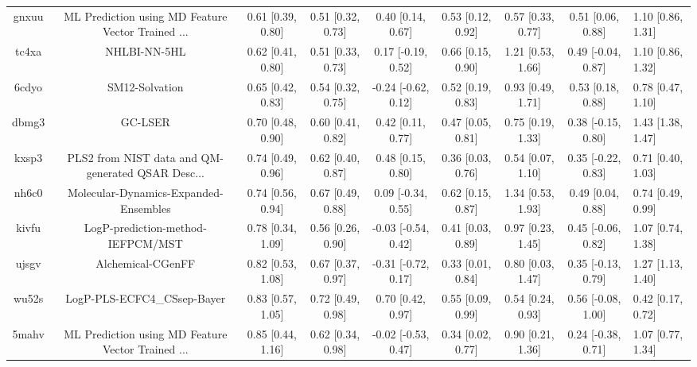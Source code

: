 \documentclass{article}
\begin{document}
\begin{center}
\begin{longtable}{|cccccccc|}
 gnxuu &  ML Prediction using MD Feature Vector Trained ... &  0.61 [0.39, 0.80] &  0.51 [0.32, 0.73] &     0.40 [0.14, 0.67] &  0.53 [0.12, 0.92] &    0.57 [0.33, 0.77] &    0.51 [0.06, 0.88] &     1.10 [0.86, 1.31] \\
 tc4xa &                                       NHLBI-NN-5HL &  0.62 [0.41, 0.80] &  0.51 [0.33, 0.73] &    0.17 [-0.19, 0.52] &  0.66 [0.15, 0.90] &    1.21 [0.53, 1.66] &   0.49 [-0.04, 0.87] &     1.10 [0.86, 1.32] \\
 6cdyo &                                     SM12-Solvation &  0.65 [0.42, 0.83] &  0.54 [0.32, 0.75] &   -0.24 [-0.62, 0.12] &  0.52 [0.19, 0.83] &    0.93 [0.49, 1.71] &    0.53 [0.18, 0.88] &     0.78 [0.47, 1.10] \\
 dbmg3 &                                            GC-LSER &  0.70 [0.48, 0.90] &  0.60 [0.41, 0.82] &     0.42 [0.11, 0.77] &  0.47 [0.05, 0.81] &    0.75 [0.19, 1.33] &   0.38 [-0.15, 0.80] &     1.43 [1.38, 1.47] \\
 kxsp3 &  PLS2 from NIST data and QM-generated QSAR Desc... &  0.74 [0.49, 0.96] &  0.62 [0.40, 0.87] &     0.48 [0.15, 0.80] &  0.36 [0.03, 0.76] &    0.54 [0.07, 1.10] &   0.35 [-0.22, 0.83] &     0.71 [0.40, 1.03] \\
 nh6c0 &              Molecular-Dynamics-Expanded-Ensembles &  0.74 [0.56, 0.94] &  0.67 [0.49, 0.88] &    0.09 [-0.34, 0.55] &  0.62 [0.15, 0.87] &    1.34 [0.53, 1.93] &    0.49 [0.04, 0.88] &     0.74 [0.49, 0.99] \\
 kivfu &                  LogP-prediction-method-IEFPCM/MST &  0.78 [0.34, 1.09] &  0.56 [0.26, 0.90] &   -0.03 [-0.54, 0.42] &  0.41 [0.03, 0.89] &    0.97 [0.23, 1.45] &   0.45 [-0.06, 0.82] &     1.07 [0.74, 1.38] \\
 ujsgv &                                  Alchemical-CGenFF &  0.82 [0.53, 1.08] &  0.67 [0.37, 0.97] &   -0.31 [-0.72, 0.17] &  0.33 [0.01, 0.84] &    0.80 [0.03, 1.47] &   0.35 [-0.13, 0.79] &     1.27 [1.13, 1.40] \\
 wu52s &                        LogP-PLS-ECFC4\_CSsep-Bayer &  0.83 [0.57, 1.05] &  0.72 [0.49, 0.98] &     0.70 [0.42, 0.97] &  0.55 [0.09, 0.99] &    0.54 [0.24, 0.93] &   0.56 [-0.08, 1.00] &     0.42 [0.17, 0.72] \\
 5mahv &  ML Prediction using MD Feature Vector Trained ... &  0.85 [0.44, 1.16] &  0.62 [0.34, 0.98] &   -0.02 [-0.53, 0.47] &  0.34 [0.02, 0.77] &    0.90 [0.21, 1.36] &   0.24 [-0.38, 0.71] &     1.07 [0.77, 1.34] \\

\end{longtable}
\end{center}
\end{document}
